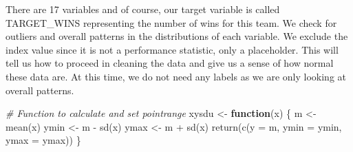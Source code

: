 \documentclass[
]{article}
\newenvironment{Shaded}{\begin{snugshade}}{\end{snugshade}}
\newcommand{\AttributeTok}[1]{\textcolor[rgb]{0.77,0.63,0.00}{#1}}
\newcommand{\CommentTok}[1]{\textcolor[rgb]{0.56,0.35,0.01}{\textit{#1}}}
\newcommand{\ControlFlowTok}[1]{\textcolor[rgb]{0.13,0.29,0.53}{\textbf{#1}}}
\newcommand{\FunctionTok}[1]{\textcolor[rgb]{0.00,0.00,0.00}{#1}}
\newcommand{\NormalTok}[1]{#1}
\newcommand{\OtherTok}[1]{\textcolor[rgb]{0.56,0.35,0.01}{#1}}
\newcommand{\SpecialCharTok}[1]{\textcolor[rgb]{0.00,0.00,0.00}{#1}}
\begin{document}
There are 17 variables and of course, our target variable is called
TARGET\_WINS representing the number of wins for this team. We check for
outliers and overall patterns in the distributions of each variable. We
exclude the index value since it is not a performance statistic, only a
placeholder. This will tell us how to proceed in cleaning the data and
give us a sense of how normal these data are. At this time, we do not
need any labels as we are only looking at overall patterns.

\begin{Shaded}
\begin{Highlighting}[]
\CommentTok{\# Function to calculate and set pointrange}
\NormalTok{xysdu }\OtherTok{\textless{}{-}} \ControlFlowTok{function}\NormalTok{(x) \{}
\NormalTok{   m }\OtherTok{\textless{}{-}} \FunctionTok{mean}\NormalTok{(x)}
\NormalTok{   ymin }\OtherTok{\textless{}{-}}\NormalTok{ m }\SpecialCharTok{{-}} \FunctionTok{sd}\NormalTok{(x)}
\NormalTok{   ymax }\OtherTok{\textless{}{-}}\NormalTok{ m }\SpecialCharTok{+} \FunctionTok{sd}\NormalTok{(x)}
   \FunctionTok{return}\NormalTok{(}\FunctionTok{c}\NormalTok{(}\AttributeTok{y =}\NormalTok{ m, }\AttributeTok{ymin =}\NormalTok{ ymin, }\AttributeTok{ymax =}\NormalTok{ ymax))}
\NormalTok{\}}


\end{Highlighting}
\end{Shaded}
\end{document}
